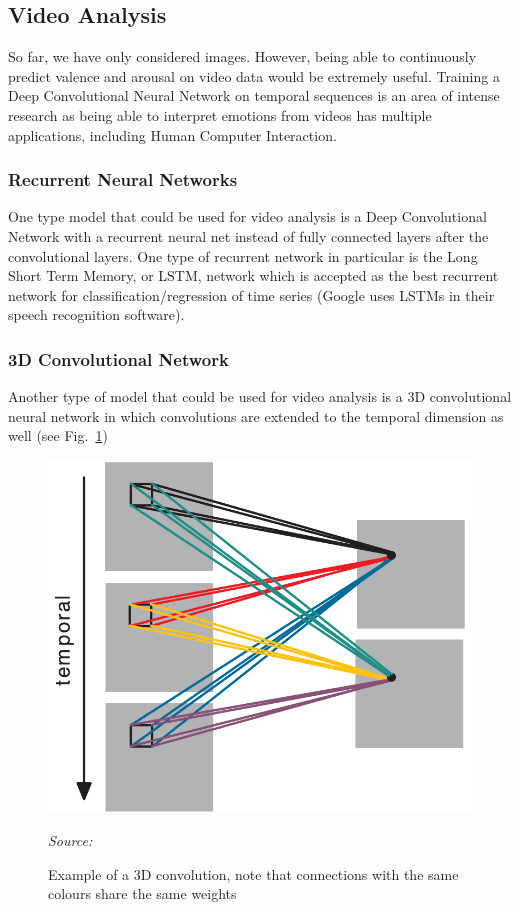 \documentclass[12pt,twoside]{article}
\newcommand{\source}[1]{\vspace{-3pt} \caption*{ \footnotesize{\textit{Source: {#1}}}} }
\begin{document}
\subsection{Video Analysis}

So far, we have only considered images. However, being able to continuously
predict valence and arousal on video data would be extremely useful. Training a
Deep Convolutional Neural Network on temporal sequences is an area of intense
research as being able to interpret emotions from videos has multiple
applications, including Human Computer Interaction.

\subsubsection{Recurrent Neural Networks}

One type model that could be used for video analysis is a Deep Convolutional
Network with a recurrent neural net instead of fully connected layers after the
convolutional layers. One type of recurrent network in particular is the Long
Short Term Memory, or LSTM, network which is accepted as the best recurrent
network for classification/regression of time series (Google uses LSTMs in
their speech recognition software).

\subsubsection{3D Convolutional Network}

Another type of model that could be used for video analysis is a 3D
convolutional neural network \cite{RefWorks:6} in which convolutions are extended to the
temporal dimension as well (see Fig.~\ref{fig:3d_conv})

\begin{figure}[ht]
  \centering
  \includegraphics[scale=0.25]{figures/3d_conv.png}
  \caption{Example of a 3D convolution, note that connections with the same
  colours share the same weights}
  \source{\cite{RefWorks:6}}
  \label{fig:3d_conv}
\end{figure}

\clearpage



\appendix
\end{document}
